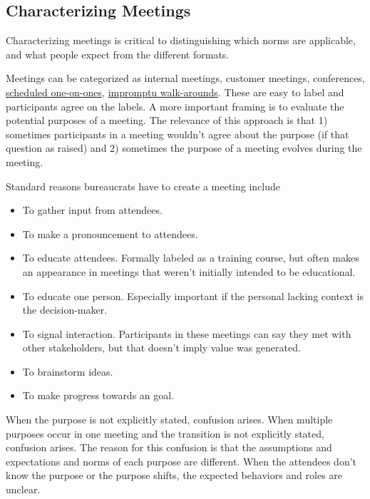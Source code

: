 \subsection*{Characterizing Meetings\label{sec:characterizing-meetings}}
Characterizing meetings is critical to distinguishing which norms are applicable, and what people expect from the different formats. 


Meetings can be categorized as internal meetings, customer meetings, conferences, \hyperref[sec:meetings-one-on-one]{scheduled one-on-ones},
\hyperref[sec:walk-arounds]{impromptu walk-arounds}. These are easy to label and participants agree on the labels.
A more important framing is to evaluate the potential purposes of a meeting. The relevance of this approach is that 1) sometimes participants in a meeting wouldn't agree about the purpose (if that question as raised) and 2) sometimes the purpose of a meeting evolves during the meeting. 

Standard reasons bureaucrats have to create a meeting include
\begin{itemize}
    \item To gather input from attendees.
    \item To make a pronouncement to attendees.
    \item To educate attendees. Formally labeled as a training course, but often makes an appearance in meetings that weren't initially intended to be educational. 
    \item To educate one person. Especially important if the personal lacking context is the decision-maker. 
    \item To signal interaction. Participants in these meetings can say they met with other stakeholders, but that doesn't imply value was generated. 
    \item To brainstorm ideas.
    \item To make progress towards an goal.
\end{itemize}
When the purpose is not explicitly stated, confusion arises. 
When multiple purposes occur in one meeting and the transition is not explicitly stated, confusion arises.
The reason for this confusion is that the assumptions and expectations and norms of each purpose are different. When the attendees don't know the purpose or the purpose shifts, the expected behaviors and roles are unclear. 

